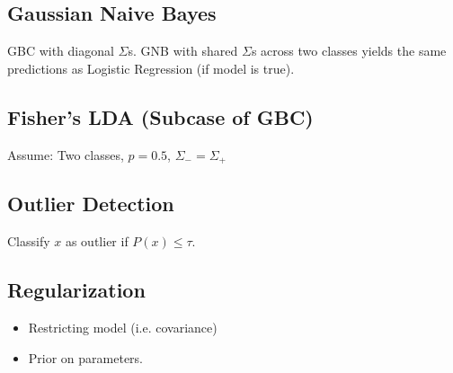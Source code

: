 \subsection*{Gaussian Naive Bayes}
GBC with diagonal $\Sigma$s. GNB with shared $\Sigma$s across
two classes yields the same predictions as Logistic Regression
(if model is true).

\subsection*{Fisher's LDA (Subcase of GBC)}
Assume: Two classes, $p = 0.5$, ${\Sigma}_- = {\Sigma}_+ $

\subsection*{Outlier Detection}
Classify $x$ as outlier if $P(x) \leq \tau$.

\subsection*{Regularization}
\begin{itemize}[noitemsep,leftmargin=6mm,topsep=0pt,parsep=0pt,partopsep=0pt]
    \item Restricting model (i.e. covariance)
    \item Prior on parameters.\\
\end{itemize}
